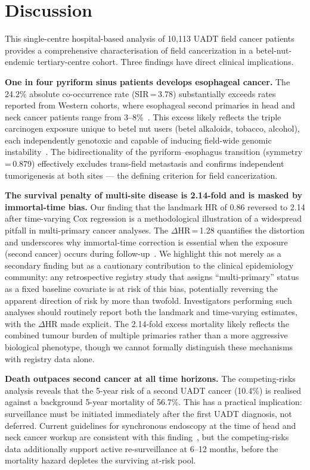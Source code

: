\documentclass[12pt,a4paper]{article}
\begin{document}
\section{Discussion}

This single-centre hospital-based analysis of 10,113 UADT field cancer patients
provides a comprehensive characterisation of field cancerization in a
betel-nut-endemic tertiary-centre cohort. Three findings have direct clinical implications.

\textbf{One in four pyriform sinus patients develops esophageal cancer.}
The 24.2\% absolute co-occurrence rate (SIR\,=\,3.78) substantially exceeds
rates reported from Western cohorts, where esophageal second primaries in head
and neck cancer patients range from 3--8\%~\citep{haughey1992,schwartz2007}.
This excess likely reflects the triple carcinogen exposure unique to betel nut
users (betel alkaloids, tobacco, alcohol), each independently genotoxic and
capable of inducing field-wide genomic instability~\citep{lin2005}.
The bidirectionality of the pyriform--esophagus transition (symmetry\,=\,0.879)
effectively excludes trans-field metastasis and confirms independent
tumorigenesis at both sites — the defining criterion for field cancerization.

\textbf{The survival penalty of multi-site disease is 2.14-fold and is masked
by immortal-time bias.}
Our finding that the landmark HR of 0.86 reversed to 2.14 after time-varying
Cox regression is a methodological illustration of a widespread pitfall in
multi-primary cancer analyses. The $\Delta$HR\,=\,1.28 quantifies the distortion
and underscores why immortal-time correction is essential when the exposure
(second cancer) occurs during follow-up~\citep{suissa2008}.
We highlight this not merely as a secondary finding but as a cautionary
contribution to the clinical epidemiology community: any retrospective
registry study that assigns ``multi-primary'' status as a fixed baseline
covariate is at risk of this bias, potentially reversing the apparent direction
of risk by more than twofold. Investigators performing such analyses should
routinely report both the landmark and time-varying estimates, with the
$\Delta$HR made explicit.
The 2.14-fold excess mortality likely reflects the combined tumour burden of
multiple primaries rather than a more aggressive biological phenotype, though
we cannot formally distinguish these mechanisms with registry data alone.

\textbf{Death outpaces second cancer at all time horizons.}
The competing-risks analysis reveals that the 5-year risk of a second UADT
cancer (10.4\%) is realised against a background 5-year mortality of 56.7\%.
This has a practical implication: surveillance must be initiated immediately
after the first UADT diagnosis, not deferred.
Current guidelines for synchronous endoscopy at the time of head and neck cancer
workup are consistent with this finding~\citep{muto2010,huang2015},
but the competing-risks data additionally support active re-surveillance at
6--12 months, before the mortality hazard depletes the surviving at-risk pool.
\end{document}
